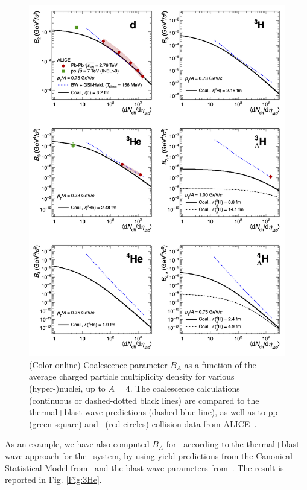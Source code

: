 \documentclass{appolb}
\begin{document}
\begin{figure}[htb]
\begin{center}
\includegraphics[width=\textwidth]{coal2Thermal2alice.png}
\caption{(Color online) Coalescence parameter $B_A$ as a function of the average charged particle multiplicity density for various (hyper-)nuclei, up to $A = 4$. The coalescence calculations (continuous or dashed-dotted black lines) are compared to the thermal+blast-wave predictions (dashed blue line), as well as to pp (green square) and \PbPb~(red circles) collision data from ALICE~\cite{ALICE:nucleipp2017,ALICE:deuteronppPbPb2015,Adam:2015yta}. }
\label{Fig:comparison}
\end{center}
\end{figure} 

As an example, we have also computed $B_A$ for \hethree~according to the thermal+blast-wave approach for the \pPb~system, by using yield predictions from the Canonical Statistical Model from~\cite{Vovchenko:2018fiy} and the blast-wave parameters from~\cite{Abelev:2013haa}. The result is reported in Fig. \ref{Fig:3He}.
\end{document}
